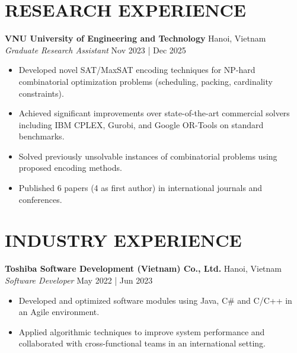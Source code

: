 \documentclass[a4paper,10pt]{extarticle}
\begin{document}
\section*{RESEARCH EXPERIENCE}
\noindent
\textbf{VNU University of Engineering and Technology} \hfill Hanoi, Vietnam\\
\textit{Graduate Research Assistant} \hfill Nov 2023 | Dec 2025
\begin{itemize}
    \item Developed novel SAT/MaxSAT encoding techniques for NP-hard combinatorial optimization problems (scheduling, packing, cardinality constraints).
    \item Achieved significant improvements over state-of-the-art commercial solvers including IBM CPLEX, Gurobi, and Google OR-Tools on standard benchmarks.
    \item Solved previously unsolvable instances of combinatorial problems using proposed encoding methods.
    \item Published 6 papers (4 as first author) in international journals and conferences.
\end{itemize}

\section*{INDUSTRY EXPERIENCE}
\noindent
\textbf{Toshiba Software Development (Vietnam) Co., Ltd.} \hfill Hanoi, Vietnam\\
\textit{Software Developer} \hfill May 2022 | Jun 2023
\begin{itemize}
    \item Developed and optimized software modules using Java, C\# and C/C++ in an Agile environment.
    \item Applied algorithmic techniques to improve system performance and collaborated with cross-functional teams in an international setting.
\end{itemize}

\end{document}
